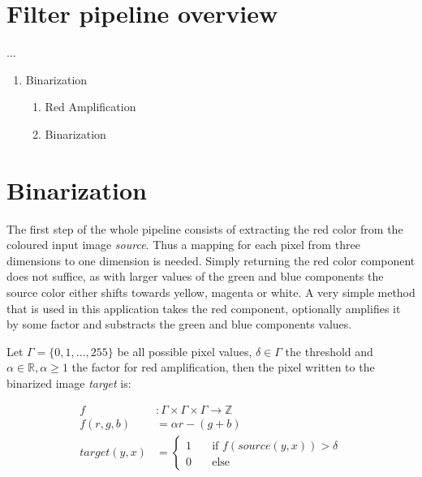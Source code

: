 \documentclass{report}
\begin{document}
\pagebreak
\section{Filter pipeline overview}
...

\begin{enumerate}
\item Binarization

  \begin{enumerate}
  \item Red Amplification
  \item Binarization
  \end{enumerate}

\end{enumerate}


\pagebreak
\section{Binarization}

The first step of the whole pipeline consists of extracting the red
color from the coloured input image \textit{source}. Thus a mapping
for each pixel from three dimensions to one dimension is
needed. Simply returning the red color component does not suffice, as
with larger values of the green and blue components the source color
either shifts towards yellow, magenta or white. A very simple method
that is used in this application takes the red component, optionally
amplifies it by some factor and substracts the green and blue
components values.

Let \( \Gamma = \{0, 1, ..., 255\} \) be all possible pixel values, \(
\delta \in \Gamma \) the threshold and \( \alpha \in \mathbb{R},
\alpha \geq 1 \) the factor for red amplification, then the pixel
written to the binarized image \textit{target} is:

\begin{equation}\label{eq:binarization}
  \begin{split}
    f & : \Gamma \times \Gamma \times \Gamma \to \mathbb{Z} \\
    f(r, g, b) & = \alpha r - (g + b) \\
    target(y, x) & =
    \begin{cases}
      1 & \quad \text{if } f(source(y, x)) > \delta \\
      0 & \quad \text{else}
    \end{cases}
  \end{split}
\end{equation}
\end{document}
